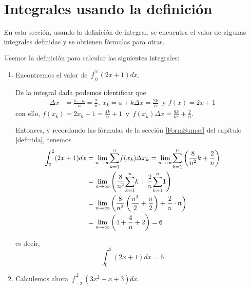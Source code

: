 \section{Integrales usando la definición}

En esta sección, usando la definición de integral, se encuentra el
valor de algunas integrales definidas y se obtienen fórmulas para
otras.


\begin{ejemplo}
\textnormal{Usemos la definición para calcular las siguientes integrales:}
\end{ejemplo}
\begin{enumerate}[leftmargin=1.2em,   itemindent=0pt,       labelwidth=\labelwidth,labelsep=0.5em,]
	
\item \textnormal{Encontremos el valor de} $\displaystyle{\int_{0}^{2}(2x+1)dx}$.

De la integral dada podemos identificar que
\begin{align*}
\Delta x&=\frac{b-a}{n}=\frac{2}{n},\ %
x_{k}=a+k\Delta x=\frac{2k}{n}\ \text{ y } %
f\left( x\right) =2x+1
\end{align*}
con ello, $f\left( x_{k}\right)=2x_{k}+1=\frac{4k}{n}+1$\ y\ $f(x_{k})\Delta x=\frac{8k}{n^{2}}+\frac{2}{n}$.

Entonces, y recordando las fórmulas de la sección \ref{FormSumas} del capítulo \ref{definida}, tenemos
{\small
\begin{align*}
\int_{0}^{2}(2x+1)dx&=\underset{n\rightarrow \infty }{\lim }\overset{n}{%
\underset{k=1}{\sum }}f(x_{k})\Delta x_{k} =\underset{n\rightarrow \infty }{\lim }\overset{n}{\underset{k=1}{\sum }}
\left( \frac{8}{n^{2}}k+\frac{2}{n}\right) \\&
=\underset{n\rightarrow \infty }{\lim }\left( \frac{8}{n^{2}}\overset{n}{
\underset{k=1}{\sum }}k+\frac{2}{n}\overset{n}{\underset{k=1}{\sum }}1\right)\\
&=\underset{n\rightarrow \infty }{\lim }\left( \frac{8}{n^{2}}\left( \frac{n^{2}}{2}+\frac{n}{2}\right) +\frac{2}{n}\cdot n\right) \\&
=\underset{n\rightarrow \infty }{\lim }\left( 4+\frac{4}{n}+2\right) =6
\end{align*}
}

es decir,
\[
\int_{0}^{2}(2x+1)dx=6 
\]

\item \textnormal{Calculemos ahora} $\displaystyle{\int_{-2}^{2}(3x^{2}-x+3)dx}$.


\end{enumerate}
